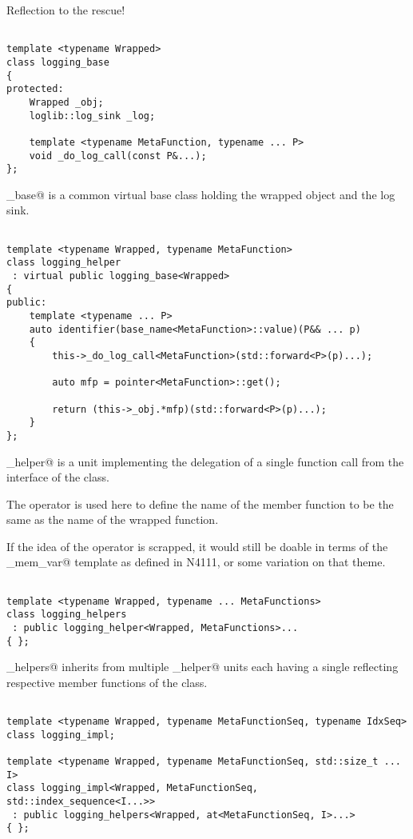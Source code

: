 Reflection to the rescue!

\begin{verbatim}

template <typename Wrapped>
class logging_base
{
protected:
	Wrapped _obj;
	loglib::log_sink _log;

	template <typename MetaFunction, typename ... P>
	void _do_log_call(const P&...);
};

\end{verbatim}

\verb@logging_base@ is a common virtual base class holding the wrapped object
and the log sink.

\begin{verbatim}

template <typename Wrapped, typename MetaFunction>
class logging_helper
 : virtual public logging_base<Wrapped>
{
public:
	template <typename ... P>
	auto identifier(base_name<MetaFunction>::value)(P&& ... p)
	{
		this->_do_log_call<MetaFunction>(std::forward<P>(p)...);

		auto mfp = pointer<MetaFunction>::get();

		return (this->_obj.*mfp)(std::forward<P>(p)...);
	}
};

\end{verbatim}

\verb@logging_helper@ is a unit implementing the delegation of a single function
call from the interface of the \verb@Wrapped@ class. 

The \verb@identifier@ operator is used here to define the name of the member function
to be the same as the name of the wrapped function.

If the idea of the \verb@identifier@ operator is scrapped, it would still be doable
in terms of the \verb@named_mem_var@ template as defined in N4111, or some variation
on that theme.

\begin{verbatim}

template <typename Wrapped, typename ... MetaFunctions>
class logging_helpers
 : public logging_helper<Wrapped, MetaFunctions>...
{ };

\end{verbatim}

\verb@logging_helpers@ inherits from multiple \verb@logging_helper@ units
each having a single  reflecting respective member functions
of the \verb@Wrapper@ class.

\begin{verbatim}

template <typename Wrapped, typename MetaFunctionSeq, typename IdxSeq>
class logging_impl;

template <typename Wrapped, typename MetaFunctionSeq, std::size_t ... I>
class logging_impl<Wrapped, MetaFunctionSeq, std::index_sequence<I...>>
 : public logging_helpers<Wrapped, at<MetaFunctionSeq, I>...>
{ };

\end{verbatim}

